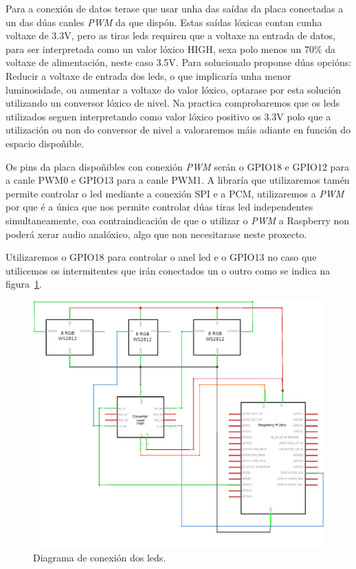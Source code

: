 Para a conexión de datos terase que usar unha das saídas da placa conectadas a un das dúas canles \emph{PWM} da que dispón. Estas saídas lóxicas contan cunha voltaxe de 3.3V, pero as tiras leds requiren que a voltaxe na entrada de datos, para ser interpretada como un valor lóxico HIGH, sexa polo menos un 70\(\%\) da  voltaxe de alimentación, neste caso 3.5V. Para solucionalo proponse dúas opcións: Reducir a voltaxe de entrada dos leds, o que implicaría unha menor luminosidade, ou aumentar a voltaxe do valor lóxico, optarase por esta solución utilizando un conversor lóxico de nivel. Na practica comprobaremos que os leds utilizados seguen interpretando como valor lóxico positivo os 3.3V polo que a utilización ou non do conversor de nivel a valoraremos máis adiante en función do espacio dispoñible.

Os pins da placa dispoñibles con conexión \emph{PWM} serán o GPIO18 e GPIO12 para a canle PWM0 e GPIO13 para a canle PWM1. A libraría que utilizaremos tamén permite controlar o led mediante a conexión SPI e a PCM, utilizaremos a \emph{PWM} por que é a única que nos permite controlar dúas tiras led independentes simultaneamente, coa contraindicación de que o utilizar o \emph{PWM} a Raspberry non poderá xerar audio analóxico, algo que non necesitarase neste proxecto.

Utilizaremos o GPIO18 para controlar o anel led e o GPIO13 no caso que utilicemos os intermitentes que irán conectados un o outro como se indica na figura~\ref{fig:conexions_leds}.

\begin{figure}[tb]
  \centering
  \includegraphics[scale=1]{imaxes/circuito-leds.png}
  \caption{Diagrama de conexión dos leds.}
  \label{fig:conexions_leds}
\end{figure}

